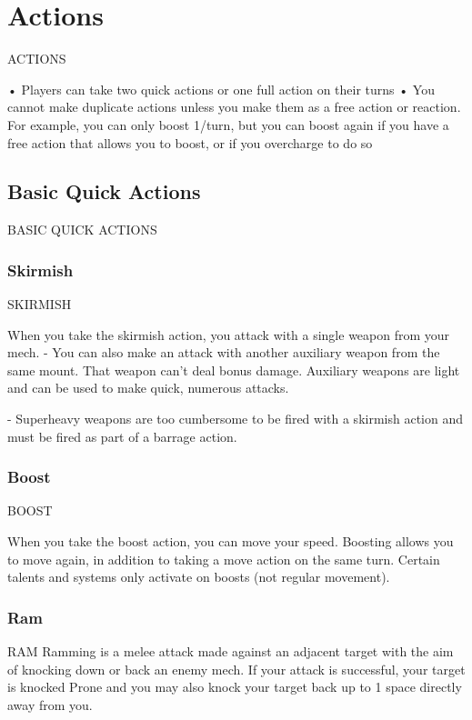 \chapter{Actions}
 ACTIONS

•   Players can take two quick actions or one full action on their turns
•   You cannot make duplicate actions unless you make them as a free action or reaction. For
    example, you can only boost 1/turn, but you can boost again if you have a free action that
    allows you to boost, or if you overcharge to do so

\section{Basic Quick Actions}

                       BASIC QUICK ACTIONS
\subsection{Skirmish}

                                             SKIRMISH

When you take the skirmish action, you attack with a single weapon from your mech.
        - You can also make an attack with another auxiliary weapon from the same mount. That
        weapon can’t deal bonus damage. Auxiliary weapons are light and can be used to make
        quick, numerous attacks.

        	- Superheavy weapons are too cumbersome to be fired with a skirmish action and must
        be fired as part of a barrage action.

\subsection{Boost}

                                                BOOST

When you take the boost action, you can move your speed. Boosting allows you to move again,
in addition to taking a move action on the same turn. Certain talents and systems only activate
on boosts (not regular movement).

\subsection{Ram}

                                                 RAM
Ramming is a melee attack made against an adjacent target with the aim of knocking down or
back an enemy mech.
If your attack is successful, your target is knocked Prone and you may also knock your target
back up to 1 space directly away from you.
